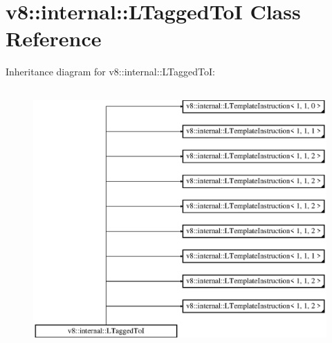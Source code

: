 \hypertarget{classv8_1_1internal_1_1_l_tagged_to_i}{}\section{v8\+:\+:internal\+:\+:L\+Tagged\+ToI Class Reference}
\label{classv8_1_1internal_1_1_l_tagged_to_i}
Inheritance diagram for v8\+:\+:internal\+:\+:L\+Tagged\+ToI\+:\begin{figure}[H]
\begin{center}
\leavevmode
\includegraphics[height=10.000000cm]{classv8_1_1internal_1_1_l_tagged_to_i}
\end{center}
\end{figure}
